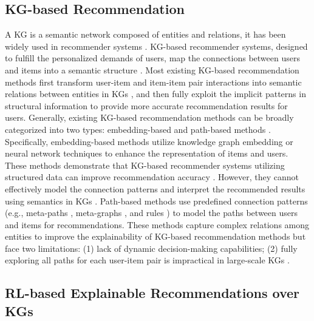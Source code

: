 \documentclass[conference]{IEEEtran}
\begin{document}
\subsection{KG-based Recommendation}
A KG is a semantic network composed of entities and relations, it has been widely used in recommender systems \cite{KGzsf}. KG-based recommender systems, designed to fulfill the personalized demands of users, map the connections between users and items into a semantic structure \cite{inf}. Most existing KG-based recommendation methods first transform user-item and item-item pair interactions into semantic relations between entities in KGs \cite{KGRS1} \cite{EX1} \cite{EX3} \cite{EX4}, and then fully exploit the implicit patterns in structural information to provide more accurate recommendation results for users. Generally, existing KG-based recommendation methods can be broadly categorized into two types: embedding-based and path-based methods \cite{KGRSsurveyrw}. Specifically, embedding-based methods  utilize knowledge graph embedding \cite{KGEsurvey} or neural network techniques\cite{gnnsurvey} \cite{wei} \cite{EX2} to enhance the representation of items and users. These methods demonstrate that KG-based recommender systems utilizing structured data can  improve recommendation accuracy \cite{NN1}. However, they cannot effectively model the connection patterns  and interpret the recommended results using semantics in KGs \cite{ADAC}. Path-based methods use predefined connection patterns (e.g., meta-paths \cite{metapath}, meta-graphs \cite{metagraph}, and rules \cite{KGRSrules}) to model the paths between users and items for recommendations. These methods capture complex relations among entities to improve the explainability of KG-based recommendation methods but face two limitations: (1) lack of dynamic decision-making capabilities; (2) fully exploring all paths for each user-item pair is impractical in large-scale KGs \cite{PGPR}. 


\subsection{RL-based Explainable Recommendations  over KGs}
\end{document}
